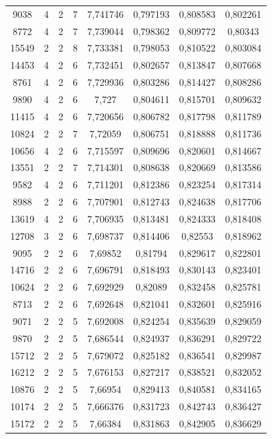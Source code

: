 \begin{longtable}{|c|c|c|c|c|c|c|c|}
9038 & 4 & 2 & 7 & 7,741746 & 0,797193 & 0,808583 & 0,802261 \\
8772 & 4 & 2 & 7 & 7,739044 & 0,798362 & 0,809772 & 0,80343 \\
15549 & 2 & 2 & 8 & 7,733381 & 0,798053 & 0,810522 & 0,803084 \\
14453 & 4 & 2 & 6 & 7,732451 & 0,802657 & 0,813847 & 0,807668 \\
8761 & 4 & 2 & 6 & 7,729936 & 0,803286 & 0,814427 & 0,808286 \\
9890 & 4 & 2 & 6 & 7,727 & 0,804611 & 0,815701 & 0,809632 \\
11415 & 4 & 2 & 6 & 7,720656 & 0,806782 & 0,817798 & 0,811789 \\
10824 & 2 & 2 & 7 & 7,72059 & 0,806751 & 0,818888 & 0,811736 \\
10656 & 4 & 2 & 6 & 7,715597 & 0,809696 & 0,820601 & 0,814667 \\
13551 & 2 & 2 & 7 & 7,714301 & 0,808638 & 0,820669 & 0,813586 \\
9582 & 4 & 2 & 6 & 7,711201 & 0,812386 & 0,823254 & 0,817314 \\
8988 & 2 & 2 & 6 & 7,707901 & 0,812743 & 0,824638 & 0,817706 \\
13619 & 4 & 2 & 6 & 7,706935 & 0,813481 & 0,824333 & 0,818408 \\
12708 & 3 & 2 & 6 & 7,698737 & 0,814406 & 0,82553 & 0,818962 \\
9095 & 2 & 2 & 6 & 7,69852 & 0,81794 & 0,829617 & 0,822801 \\
14716 & 2 & 2 & 6 & 7,696791 & 0,818493 & 0,830143 & 0,823401 \\
10624 & 2 & 2 & 6 & 7,692929 & 0,82089 & 0,832458 & 0,825781 \\
8713 & 2 & 2 & 6 & 7,692648 & 0,821041 & 0,832601 & 0,825916 \\
9071 & 2 & 2 & 5 & 7,692008 & 0,824254 & 0,835639 & 0,829059 \\
9870 & 2 & 2 & 5 & 7,686544 & 0,824937 & 0,836291 & 0,829722 \\
15712 & 2 & 2 & 5 & 7,679072 & 0,825182 & 0,836541 & 0,829987 \\
16212 & 2 & 2 & 5 & 7,676153 & 0,827217 & 0,838521 & 0,832052 \\
10876 & 2 & 2 & 5 & 7,66954 & 0,829413 & 0,840581 & 0,834165 \\
10174 & 2 & 2 & 5 & 7,666376 & 0,831723 & 0,842743 & 0,836427 \\
15172 & 2 & 2 & 5 & 7,66384 & 0,831863 & 0,842905 & 0,836629 \\

\end{longtable}
